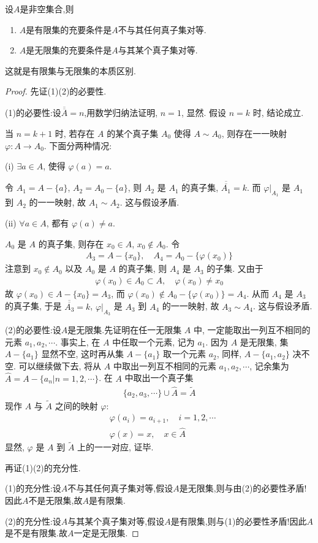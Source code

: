 \documentclass[../../main.tex]{subfiles}
\begin{document}
\begin{theorem}
设$A$是非空集合,则
\begin{enumerate}[(1)]
\item $A$是有限集的充要条件是$A$不与其任何真子集对等.
\item $A$是无限集的充要条件是$A$与其某个真子集对等.
\end{enumerate}
\end{theorem}
\begin{note}
这就是有限集与无限集的本质区别.
\end{note}
\begin{proof}
先证(1)(2)的必要性.

(1)的必要性:设$\overline{\overline{A}} = n$,用数学归纳法证明, $n = 1$, 显然. 假设 $n = k$ 时, 结论成立.

当 $n = k + 1$ 时, 若存在 $A$ 的某个真子集 $A_0$ 使得 $A \sim A_0$, 则存在一一映射 $\varphi : A \to A_0$. 下面分两种情况:

(i) $\exists a \in A$, 使得 $\varphi(a) = a$.

令 $A_1 = A - \{a\}$, $A_2 = A_0 - \{a\}$, 则 $A_2$ 是 $A_1$ 的真子集, $\overline{\overline{A_1}} = k$. 而 $\varphi|_{A_1}$ 是 $A_1$ 到 $A_2$ 的一一映射, 故 $A_1 \sim A_2$. 这与假设矛盾.

(ii) $\forall a \in A$, 都有 $\varphi(a) \neq a$.

$A_0$ 是 $A$ 的真子集, 则存在 $x_0 \in A$, $x_0 \notin A_0$. 令
\begin{align*}
A_3 = A - \{x_0\}, \quad A_4 = A_0 - \{\varphi(x_0)\}
\end{align*}
注意到 $x_0 \notin A_0$ 以及 $A_0$ 是 $A$ 的真子集, 则 $A_4$ 是 $A_3$ 的子集. 又由于
\begin{align*}
\varphi(x_0) \in A_0 \subset A, \quad \varphi(x_0) \neq x_0
\end{align*}
故 $\varphi(x_0) \in A - \{x_0\} = A_3$, 而 $\varphi(x_0) \notin A_0 - \{\varphi(x_0)\} = A_4$. 从而 $A_4$ 是 $A_3$ 的真子集, 于是 $\overline{\overline{A_3}} = k$, $\varphi|_{A_3}$ 是 $A_3$ 到 $A_4$ 的一一映射, 故 $A_3 \sim A_4$. 这与假设矛盾. 

(2)的必要性:设$A$是无限集.先证明在任一无限集 $A$ 中, 一定能取出一列互不相同的元素 $a_1, a_2, \cdots$. 事实上, 在 $A$ 中任取一个元素, 记为 $a_1$. 因为 $A$ 是无限集, 集 $A - \{a_1\}$ 显然不空, 这时再从集 $A - \{a_1\}$ 取一个元素 $a_2$, 同样, $A - \{a_1, a_2\}$ 决不空. 可以继续做下去, 将从 $A$ 中取出一列互不相同的元素 $a_1, a_2, \cdots$, 记余集为 $\hat{A} = A - \{a_n | n = 1, 2, \cdots\}$. 在 $A$ 中取出一个真子集
\begin{align*}
\{a_2, a_3, \cdots\} \cup \hat{A} = \tilde{A}
\end{align*}
现作 $A$ 与 $\tilde{A}$ 之间的映射 $\varphi$:
\begin{align*}
&\varphi(a_i) = a_{i + 1}, \quad i = 1, 2, \cdots\\
&\varphi(x) = x, \quad x \in \hat{A}
\end{align*}
显然, $\varphi$ 是 $A$ 到 $\tilde{A}$ 上的一一对应, 证毕. 

再证(1)(2)的充分性.

(1)的充分性:设$A$不与其任何真子集对等,假设$A$是无限集,则与由(2)的必要性矛盾!因此$A$不是无限集,故$A$是有限集.

(2)的充分性:设$A$与其某个真子集对等,假设$A$是有限集,则与(1)的必要性矛盾!因此$A$是不是有限集.故$A$一定是无限集.

\end{proof}
\end{document}
